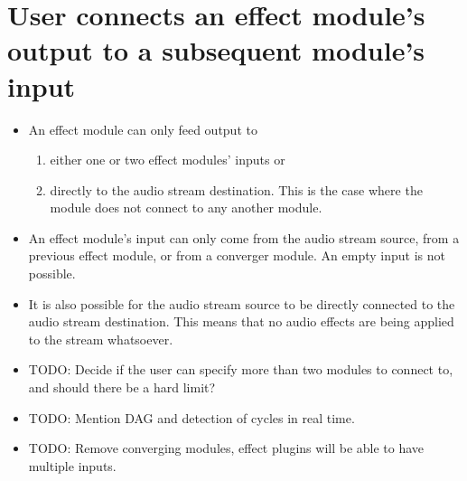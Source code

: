\section{User connects an effect module's output to a subsequent module's input}


\begin{itemize}
	\item An effect module can only feed output to
	\begin{enumerate}
		\item either one or two effect modules' inputs or
		\item directly to the audio stream destination. This is the case where the module does not connect to any another module.
	\end{enumerate}
	
	
	
	\item An effect module's input can only come from the audio stream source, from a previous effect module, or from a converger module. An empty input is not possible.

	\item It is also possible for the audio stream source to be directly connected to the audio stream destination. This means that no audio effects are being applied to the stream whatsoever. 

	\item TODO: Decide if the user can specify more than two modules to connect to, and should there be a hard limit?
	
	\item TODO: Mention DAG and detection of cycles in real time.


	\item TODO: Remove converging modules, effect plugins will be able to have multiple inputs.



\end{itemize}
